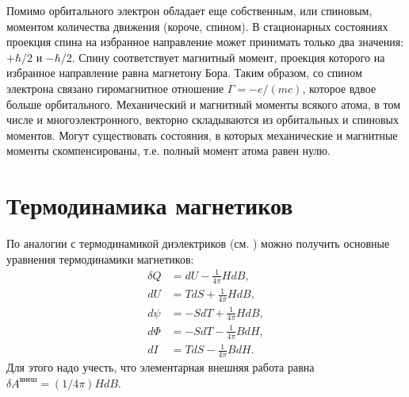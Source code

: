 \documentclass[12pt]{article}
\begin{document}
  Помимо орбитального электрон обладает еще собственным, или спиновым, моментом количества движения (короче, спином). В стационарных состояниях проекция спина на избранное направление может принимать только два значения: $+\hbar / 2$ и $-\hbar / 2$. Спину соответствует магнитный момент, проекция которого на избранное направление равна магнетону Бора. Таким образом, со спином электрона связано гиромагнитное отношение $\Gamma=-e /(m c)$, которое вдвое больше орбитального. Механический и магнитный моменты всякого атома, в том числе и многоэлектронного, векторно складываются из орбитальных и спиновых моментов. Могут существовать состояния, в которых механические и магнитные моменты скомпенсированы, т.е. полный момент атома равен нулю.

  \section{Термодинамика магнетиков}
  По аналогии с термодинамикой диэлектриков (см. \cite[\S31]{sivykhin3}) можно получить основные уравнения
  термодинамики магнетиков:
  \begin{align}
    \delta Q  &= dU - \frac{1}{4\pi}HdB,\\
    dU &= TdS + \frac{1}{4\pi}HdB,\\
    d\psi &= -SdT + \frac{1}{4\pi}HdB,\\ \label{eq:term4}
    d\Phi &= -SdT - \frac{1}{4\pi}BdH,\\
    dI &= TdS - \frac{1}{4\pi}BdH.
  \end{align}
  Для этого надо учесть, что элементарная внешняя работа равна $\delta A^{\text{внеш}} = (1/4\pi)HdB$.
\end{document}
